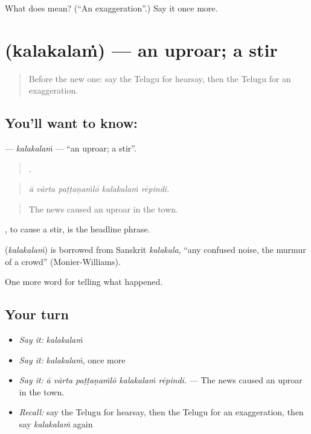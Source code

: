 \begin{tcolorbox}[breakable,colback=teal!4,colframe=teal!35!black,title={Before you move on}]
What does  mean? (\textquotedblleft{}An exaggeration\textquotedblright{}.) Say it once more.
\end{tcolorbox}
\section[\texorpdfstring{\te{కలకలం} (kalakalaṁ)}{కలకలం (kalakalaṁ)}]{ (kalakalaṁ) — an uproar; a stir}

\label{lesson:TE-C336-kalakalam}



\begin{quote}
Before the new one: say the Telugu for hearsay, then the Telugu for an exaggeration.
\end{quote}

\subsection*{You'll want to know: }
\textbf{} — \emph{kalakalaṁ} — \textquotedblleft{}an uproar; a stir\textquotedblright{}.

\begin{quote}
    .
\end{quote}

\begin{quote}
\emph{ā vārta paṭṭaṇaṁlō kalakalaṁ rēpindi.}
\end{quote}

\begin{quote}
The news caused an uproar in the town.
\end{quote}

 , to cause a stir, is the headline phrase.

\begin{cousinweb}
\textbf{} (\emph{kalakalaṁ}) is borrowed from Sanskrit \emph{kalakala}, \textquotedblleft{}any confused noise, the murmur of a crowd\textquotedblright{} (Monier-Williams).
\end{cousinweb}

\begin{grammarlens}[title={What you've built}]
One more word for telling what happened.
\end{grammarlens}

\subsection*{Your turn}
\begin{itemize}
\raggedright
  \item \emph{Say it:} \emph{kalakalaṁ}
  \item \emph{Say it:} \emph{kalakalaṁ}, once more
  \item \emph{Say it:} \emph{ā vārta paṭṭaṇaṁlō kalakalaṁ rēpindi.} — The news caused an uproar in the town.
  \item \emph{Recall:} say the Telugu for hearsay, then the Telugu for an exaggeration, then say \emph{kalakalaṁ} again
\end{itemize}

